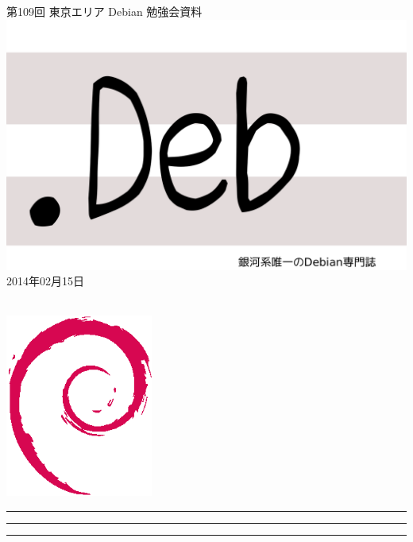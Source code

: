 \documentclass[mingoth,a4paper]{jsarticle}
\newcommand{\debmtgyear}{2014}
\newcommand{\debmtgmonth}{02}
\newcommand{\debmtgdate}{15}
\newcommand{\debmtgnumber}{109}
\begin{document}
\begin{titlepage}
\thispagestyle{empty}

\vspace*{-2cm}
第\debmtgnumber{}回 東京エリア Debian 勉強会資料\\
\hspace*{-2cm}
\includegraphics{image2012-natsu/dotdeb.pdf}\\
\hfill{}\debmtgyear{}年\debmtgmonth{}月\debmtgdate{}日

\\

\vspace*{-2cm}
\hfill{}\includegraphics[height=6cm]{image200502/openlogo-nd.eps}
\end{titlepage}

\newpage

\begin{minipage}[b]{0.2\hsize}
 \colorbox{titleback}{}
\end{minipage}
\begin{minipage}[b]{0.8\hsize}
\hrule
\vspace{2mm}
\hrule
\begin{multicols}{2}
\tableofcontents
\end{multicols}
\vspace{2mm}
\hrule
\end{minipage}
\end{document}
